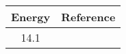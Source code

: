 \begin{tabular}{|c||c|} 
    \hline 
    \bf{Energy} & \bf{Reference} \\
    \hline
    \hline 
    14.1 & \cite{Meier1969}\\
    \hline
\end{tabular}
